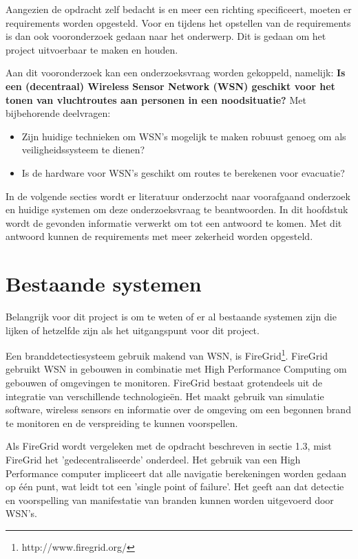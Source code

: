 
Aangezien de opdracht zelf bedacht is en meer een richting specificeert, moeten er requirements worden opgesteld. Voor en tijdens het opstellen van de requirements is dan ook vooronderzoek gedaan naar het onderwerp. Dit is gedaan om het project uitvoerbaar te maken en houden.

Aan dit vooronderzoek kan een onderzoeksvraag worden gekoppeld, namelijk: 
\textbf{Is een (decentraal) Wireless Sensor Network (WSN) geschikt voor het tonen van vluchtroutes aan personen in een noodsituatie?} Met bijbehorende deelvragen:
\begin{itemize}
\item Zijn huidige technieken om WSN's mogelijk te maken robuust genoeg om als veiligheidssysteem te dienen?
\item Is de hardware voor WSN's geschikt om routes te berekenen voor evacuatie?
\end{itemize}

In de volgende secties wordt er literatuur onderzocht naar voorafgaand onderzoek en huidige systemen om deze onderzoeksvraag te beantwoorden. In dit hoofdstuk wordt de gevonden informatie verwerkt om tot een antwoord te komen. Met dit antwoord kunnen de requirements met meer zekerheid worden opgesteld.

\section{Bestaande systemen}
Belangrijk voor dit project is om te weten of er al bestaande systemen zijn die lijken of hetzelfde zijn als het uitgangspunt voor dit project. 

Een branddetectiesysteem gebruik makend van WSN, is FireGrid\footnote{http://www.firegrid.org/}\cite{FireGrid}. FireGrid gebruikt WSN in gebouwen in combinatie met High Performance Computing om gebouwen of omgevingen te monitoren. FireGrid bestaat grotendeels uit de integratie van verschillende technologieën. Het maakt gebruik van simulatie software, wireless sensors en informatie over de omgeving om een begonnen brand te monitoren en de verspreiding te kunnen voorspellen. 

Als FireGrid wordt vergeleken met de opdracht beschreven in sectie 1.3, mist FireGrid het 'gedecentraliseerde' onderdeel. Het gebruik van een High Performance computer impliceert dat alle navigatie berekeningen worden gedaan op één punt, wat leidt tot een 'single point of failure'. Het geeft aan dat detectie en voorspelling van manifestatie van branden kunnen worden uitgevoerd door WSN's.

